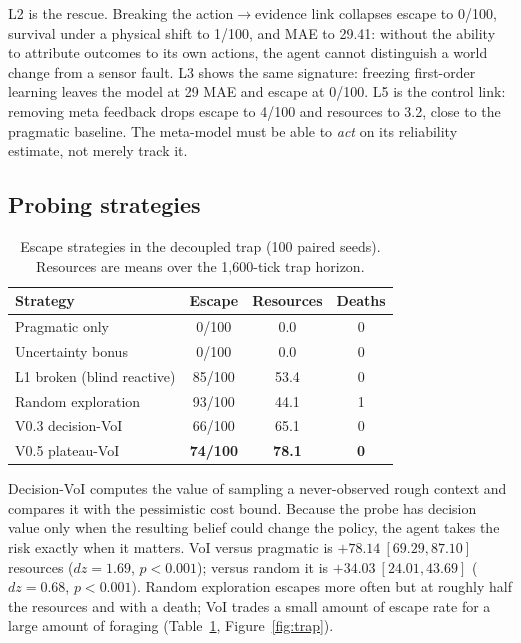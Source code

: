 \documentclass[11pt,a4paper]{article}
\begin{document}
L2 is the rescue. Breaking the action$\rightarrow$evidence link collapses escape to 0/100, survival under a physical shift to 1/100, and MAE to 29.41: without the ability to attribute outcomes to its own actions, the agent cannot distinguish a world change from a sensor fault. L3 shows the same signature: freezing first-order learning leaves the model at 29 MAE and escape at 0/100. L5 is the control link: removing meta feedback drops escape to 4/100 and resources to 3.2, close to the pragmatic baseline. The meta-model must be able to \emph{act} on its reliability estimate, not merely track it.

\subsection{Probing strategies}

\begin{table}[t]
\centering
\small
\caption{Escape strategies in the decoupled trap (100 paired seeds). Resources are means over the 1{,}600-tick trap horizon.}
\label{tab:trap}
\begin{tabular}{lccc}
\toprule
Strategy & Escape & Resources & Deaths \\
\midrule
Pragmatic only & 0/100 & 0.0 & 0 \\
Uncertainty bonus & 0/100 & 0.0 & 0 \\
L1 broken (blind reactive) & 85/100 & 53.4 & 0 \\
Random exploration & 93/100 & 44.1 & 1 \\
V0.3 decision-VoI & 66/100 & 65.1 & 0 \\
V0.5 plateau-VoI & \textbf{74/100} & \textbf{78.1} & \textbf{0} \\
\bottomrule
\end{tabular}
\end{table}

Decision-VoI computes the value of sampling a never-observed rough context and compares it with the pessimistic cost bound. Because the probe has decision value only when the resulting belief could change the policy, the agent takes the risk exactly when it matters. VoI versus pragmatic is $\mathbf{+78.14\ [69.29,87.10]}$ resources ($dz=1.69$, $p<0.001$); versus random it is $\mathbf{+34.03\ [24.01,43.69]}$ ($dz=0.68$, $p<0.001$). Random exploration escapes more often but at roughly half the resources and with a death; VoI trades a small amount of escape rate for a large amount of foraging (Table~\ref{tab:trap}, Figure~\ref{fig:trap}).
\end{document}
